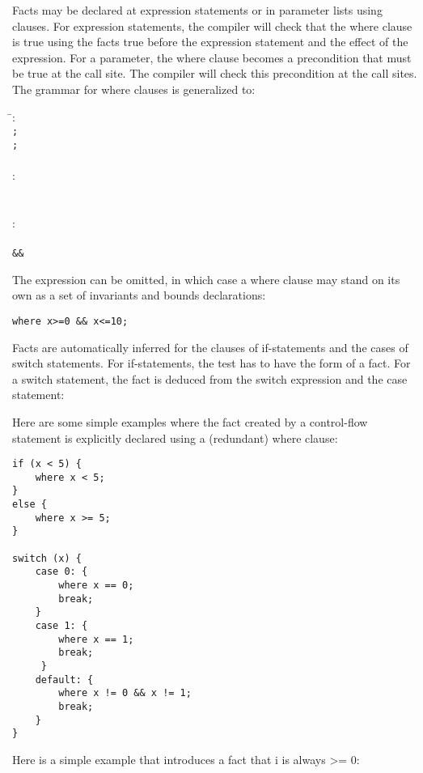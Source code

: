 Facts may be declared at expression statements or in parameter lists
using  clauses. For expression statements, the compiler
will check that the where clause is true using the facts true before the
expression statement and the effect of the expression. For a parameter,
the where clause becomes a precondition that must be true at the call
site. The compiler will check this precondition at the call sites. The
grammar for where clauses is generalized to:

\begin{tabbing}
\=:\\
\> \texttt{;} \\
\> \texttt{;} \\
\\
: \\
\>   \\
\\
:\\
\> \\
\>  \texttt{\&\&} 
\end{tabbing}

The expression can be omitted, in which case a where clause may stand on
its own as a set of invariants and bounds declarations:
\begin{verbatim}
where x>=0 && x<=10;
\end{verbatim}

Facts are automatically inferred for the clauses of if-statements and
the cases of switch statements. For if-statements, the test has to have
the form of a fact. For a switch statement, the fact is deduced from the
switch expression and the case statement:

Here are some simple examples where the fact created by a control-flow
statement is explicitly declared using a (redundant) where clause:

\begin{verbatim}
if (x < 5) {
    where x < 5;
}
else {
    where x >= 5;
} 

switch (x) {
    case 0: {
        where x == 0;
        break;
    }
    case 1: {
        where x == 1;
        break;
     }   
    default: {
        where x != 0 && x != 1;
        break;
    }
}
\end{verbatim}

Here is a simple example that introduces a fact that i is always
\textgreater{}= 0:

